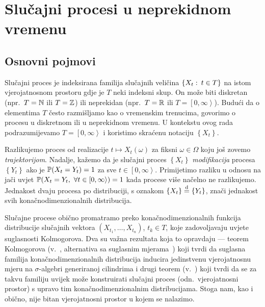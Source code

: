 \documentclass[main.tex]{subfiles}
\begin{document}
\nocite{*}

\chapter{Slučajni procesi u neprekidnom vremenu} \label{ch:sp}
\section{Osnovni pojmovi} \label{sec:sp-osnovni}
Slučajni proces je indeksirana familija slučajnih veličina \( \left\{ X_t \st t \in T \right\} \) na istom vjerojatnosnom prostoru
gdje je \( T \) neki indeksni skup. On može biti diskretan (npr.\ \( T = \N \) ili \( T = \Z \))
ili neprekidan (npr.\ \( T = \R \) ili \( T = \left[ 0, \infty \right\rangle  \)). Budući da o
elementima \( T \) često razmišljamo kao o vremenskim trenucima, govorimo o procesu u diskretnom
ili u neprekidnom vremenu.
U kontekstu ovog rada podrazumijevamo \( T = \left[ 0,\infty \right\rangle \) i koristimo skraćenu notaciju
\( \left\{ X_t \right\} \).

Razlikujemo proces od realizacije
\( t \mapsto X_t(\omega) \) za fiksni \( \omega \in \Omega \)
koju još zovemo \emph{trajektorijom}. Nadalje, kažemo da je slučajni proces \( \left\{ X_t \right\} \) \emph{modifikacija} procesa
\( \left\{ Y_t \right\} \) ako je \( \P(X_t = Y_t) = 1 \) za sve \( t \in \left[ 0,\infty \right\rangle \). Primijetimo razliku u odnosu
na jači uvjet \( \P(X_t = Y_t,\ \forall t \in \left[ 0,\infty \right\rangle) = 1 \) kada procese više načelno ne razlikujemo.
Jednakost dvaju procesa po distribuciji, s oznakom \( \{ X_t \} \jpod \{ Y_t \}\), znači jednakost svih konačnodimenzionalnih distribucija.

Slučajne procese obično promatramo preko konačnodimenzionalnih funkcija distribucije
slučajnih vektora \( (X_{t_1},\ldots,X_{t_n}) \), \( t_k \in T \), koje zadovoljavaju uvjete suglasnosti Kolmogorova.
Dva su važna rezultata koja to opravdaju --- teorem Kolmogorova (v.~\cite[tm.~9.6]{sarapa}, alternativa sa suglasnim mjerama~\cite[tm.~1.8]{sato}) koji tvrdi
da suglasna familija konačnodimenzionalnih distribucija inducira je\-din\-stve\-nu vjerojatnosnu mjeru na \( \sigma \)-algebri generiranoj cilindrima
i drugi teorem (v.~\cite[tm.~9.7]{sarapa}) koji tvrdi da se za takvu familiju uvijek može konstruirati
slučajni proces (odn.\ vjerojatnosni prostor) s upravo tim konačnodimenzionalnim distribucijama. Stoga nam, kao i obično,
nije bitan vjerojatnosni prostor u kojem se nalazimo.
\end{document}
